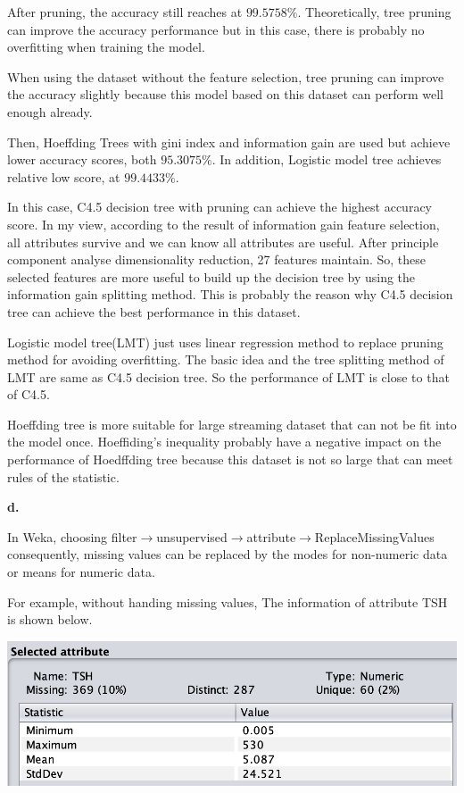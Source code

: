 \documentclass{article}
\begin{document}
After pruning, the accuracy still reaches at $99.5758\%$. Theoretically, tree pruning can improve the accuracy performance but in this case, there is probably no overfitting when training the model.

When using the dataset without the feature selection, tree pruning can improve the accuracy slightly because this model based on this dataset can perform well enough already.

Then, Hoeffding Trees with gini index and information gain are used but achieve lower accuracy scores, both $95.3075\%$. In addition,  Logistic model tree achieves relative low score, at $99.4433\%$.

In this case, C4.5 decision tree with pruning can achieve the highest accuracy score. In my view, according to the result of information gain feature selection, all attributes survive and we can know all attributes are useful. After principle component analyse dimensionality reduction, 27 features maintain. So, these selected features are more useful to build up the decision tree by using the information gain splitting method. This is probably the reason why C4.5 decision tree can achieve the best performance in this dataset.

Logistic model tree(LMT) just uses linear regression method to replace pruning method for avoiding overfitting. The basic idea and the tree splitting method of LMT are same as C4.5 decision tree. So the performance of LMT is close to that of C4.5.

Hoeffding tree is more suitable for large streaming dataset that can not be fit into the model once. Hoeffiding's inequality probably have a negative impact on the performance of Hoedffding tree because this dataset is not so large that can meet rules of the statistic.

\bigskip

\textbf{d.}

In Weka, choosing filter$\rightarrow$unsupervised$\rightarrow$attribute$\rightarrow$ReplaceMissingValues consequently, missing values can be replaced by the modes for non-numeric data or means for numeric data.

For example, without handing missing values, The information of attribute TSH is shown below.

\smallskip

\includegraphics[scale=0.5]{tsh_origin.png}
\end{document}
